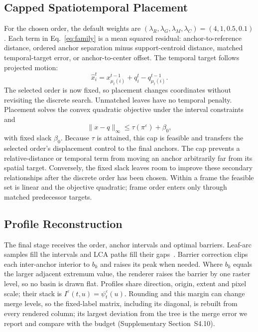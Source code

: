\subsection{Capped Spatiotemporal Placement}
For the chosen order, the default weights are $(\lambda_R,\lambda_G,\lambda_M,\lambda_C)=(4,1,0.5,0.1)$. Each term in Eq.~\ref{eq:family} is a mean squared residual: anchor-to-reference distance, ordered anchor separation minus support-centroid distance, matched temporal-target error, or anchor-to-center offset. The temporal target follows projected motion:
\begin{equation}\label{eq:temporal_target}
\hat x_i^t=x_{\mu_t(i)}^{t-1}+q_i^t-q_{\mu_t(i)}^{t-1}.
\end{equation}
The selected order is now fixed, so placement changes coordinates without revisiting the discrete search. Unmatched leaves have no temporal penalty. Placement solves the convex quadratic objective under the interval constraints and
\begin{equation}\label{eq:qp}
\|x-q\|_\infty\le\tau(\pi^\varepsilon)+\beta_0,
\end{equation}
with fixed slack $\beta_0$. Because $\tau$ is attained, this cap is feasible and transfers the selected order's displacement control to the final anchors. The cap prevents a relative-distance or temporal term from moving an anchor arbitrarily far from its spatial target. Conversely, the fixed slack leaves room to improve these secondary relationships after the discrete order has been chosen. Within a frame the feasible set is linear and the objective quadratic; frame order enters only through matched predecessor targets.

\subsection{Profile Reconstruction}\label{sec:reconstruction}
The final stage receives the order, anchor intervals and optimal barriers. Leaf-arc samples fill the intervals and LCA paths fill their gaps~\cite{Koepp:2023:TMTM,STMTM:2026}. Barrier correction clips each inter-anchor interior to $b_k$ and raises its peak when needed. Where $b_k$ equals the larger adjacent extremum value, the renderer raises the barrier by one raster level, so no basin is drawn flat. Profiles share direction, origin, extent and pixel scale; their stack is $I^\varepsilon(t,u)=\psi_t^\varepsilon(u)$. Rounding and this margin can change merge levels, so the fixed-label matrix, including its diagonal, is rebuilt from every rendered column; its largest deviation from the tree is the merge error we report and compare with the budget (Supplementary Section~S4.10).